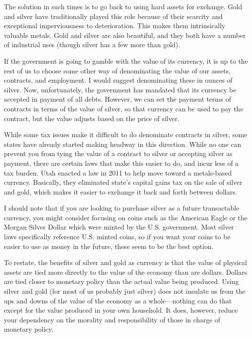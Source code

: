 The solution in such times is to go back to using hard assets for
exchange. Gold and silver have traditionally played this role because
of their scarcity and exceptional imperviousness to deterioration. This
makes them intrinsically valuable metals. Gold and silver are also
beautiful, and they both have a number of industrial uses (though
silver has a few more than gold).

If the government is going to gamble with the value of its currency, it
is up to the rest of us to choose some other way of denominating the
value of our assets, contracts, and employment. I would suggest
denominating these in ounces of silver. Now, unfortunately, the
government has mandated that its currency be accepted in payment of all
debts. However, we can set the payment terms of contracts in terms of
the value of silver, so that currency can be used to pay the contract,
but the value adjusts based on the price of silver. 

While some tax issues make it difficult to do denominate contracts in
silver, some states have already started making headway in this
direction. While no one can prevent you from tying the value of a
contract to silver or accepting silver as payment, there are certain
laws that make this easier to do, and incur less of a tax burden. Utah
enacted a law in 2011 to help move toward a metals-based currency.
Basically, they eliminated state's capital gains tax on the sale of
silver and gold, which makes it easier to exchange it back and forth
between dollars.

I should note that if you are looking to purchase silver as a future
transactable currency, you might consider focusing on coins such
as the American Eagle or the Morgan Silver Dollar which were minted
by the U.S. government. Most silver laws specifically reference U.S.
minted coins, so if you want your coins to be easier to use as money in the
future, these seem to be the best option.

To restate, the benefits of silver and gold as currency is that the
value of physical assets are tied more directly to the value of the
economy than are dollars.  Dollars are tied closer to monetary policy
than the actual value being produced. Using silver and gold (for most
of us probably just silver) does not insulate us from the ups and downs
of the value of the economy as a whole---nothing can do that except for
the value produced in your own household. It does, however, reduce your
dependency on the morality and responsibility of those in charge of
monetary policy.

